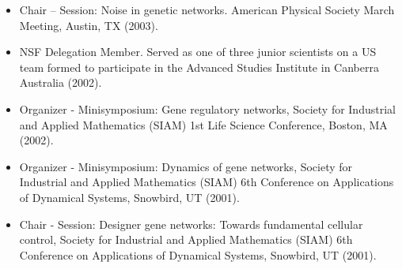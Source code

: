 \documentclass[11pt,a4paper,sans]{moderncv}        %
\begin{document}
\begin{itemize}
\item Chair -- Session: Noise in genetic networks. American Physical
Society March Meeting, Austin, TX (2003).
\item NSF Delegation Member. Served as one of three junior scientists
on a US team formed to participate in the Advanced Studies
Institute in Canberra Australia (2002).
\item Organizer - Minisymposium: Gene regulatory networks, Society for Industrial
and Applied Mathematics (SIAM) 1st Life Science Conference,
Boston, MA (2002).
\item Organizer - Minisymposium: Dynamics of gene networks, Society for Industrial and
Applied Mathematics (SIAM) 6th Conference on Applications of
Dynamical Systems, Snowbird, UT (2001).
\item Chair - Session: Designer gene networks: Towards fundamental cellular control,
Society for Industrial and Applied Mathematics (SIAM) 6th
Conference on Applications of Dynamical Systems, Snowbird, UT
(2001).
\end{itemize}


%
%
%
%
%
\end{document}
